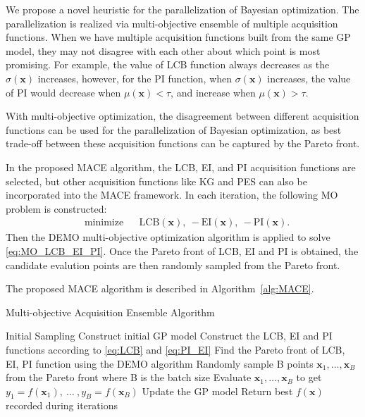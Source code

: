 We propose a novel heuristic for the parallelization of Bayesian optimization.
The parallelization is realized via multi-objective ensemble of multiple
acquisition functions. When we have multiple acquisition functions built from
the same GP model, they may not disagree with each other about which point is
most promising. For example, the value of LCB function always decreases as the
$\sigma(\bm{x})$ increases, however, for the PI function, when $\sigma(\bm{x})$
increases, the value of PI would decrease when $\mu(\bm{x}) < \tau$, and
increase when $\mu(\bm{x}) > \tau$.


With multi-objective optimization, the disagreement between different
acquisition functions can be used for the parallelization of Bayesian
optimization, as best trade-off between these acquisition functions can be
captured by the Pareto front.

In the proposed MACE algorithm, the LCB, EI, and PI acquisition functions are selected, but other acquisition functions like KG and PES can also be incorporated into the MACE framework. In each iteration, the following MO problem is constructed:
\begin{equation}
    \label{eq:MO_LCB_EI_PI}
    \begin{aligned}
        & \text{minimize} & & \mathrm{LCB}(\bm{x}),~-\mathrm{EI}(\bm{x}),~-\mathrm{PI}(\bm{x}).
    \end{aligned}
\end{equation}
Then the DEMO multi-objective optimization algorithm is applied to solve \eqref{eq:MO_LCB_EI_PI}. Once the Pareto front of LCB, EI and PI is obtained, the candidate evalution points are then randomly sampled from the Pareto front.


The proposed MACE algorithm is described in Algorithm~\ref{alg:MACE}.


\begin{algorithm}
\caption{Multi-objective Acquisition Ensemble Algorithm}
\label{alg:MACE}
\begin{algorithmic}[1]
\STATE Initial Sampling
\STATE Construct initial GP model
    \STATE Construct the LCB, EI and PI functions according to \eqref{eq:LCB} and \eqref{eq:PI_EI}
    \STATE Find the Pareto front of LCB, EI, PI function using the DEMO algorithm
    \STATE Randomly sample B points $\bm{x}_1, \dots, \bm{x}_B$ from the Pareto front where B is the batch size
    \STATE Evaluate $\bm{x}_1, \dots, \bm{x}_B$ to get $y_1 = f(\bm{x}_1),~\dots~,y_B = f(\bm{x}_B)$
    \STATE Update the GP model
\ENDFOR
\STATE Return best $f(\bm{x})$ recorded during iterations
\end{algorithmic}
\end{algorithm}
